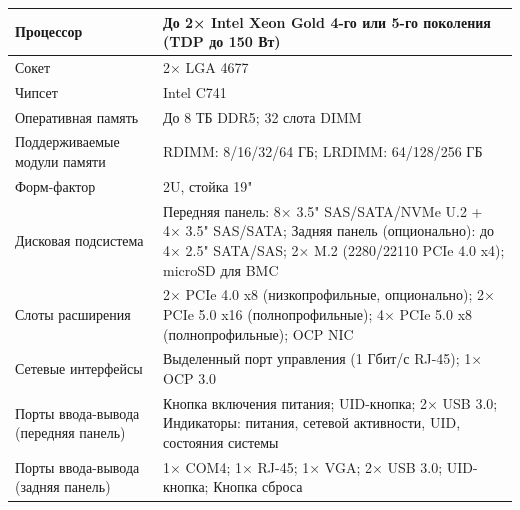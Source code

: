 \documentclass[14pt, a4paper]{extarticle}
\begin{document}
\begin{tabularx}{\textwidth}{|l|X|}
  Процессор                            & До 2× Intel Xeon Gold 4-го или 5-го поколения (TDP до 150 Вт)                                                                                                     \\\hline
  Сокет                                & 2× LGA 4677                                                                                                                                                       \\\hline
  Чипсет                               & Intel C741                                                                                                                                                        \\\hline
  Оперативная память                   & До 8 ТБ DDR5; 32 слота DIMM                                                                                                                                       \\\hline
  Поддерживаемые модули памяти         & RDIMM: 8/16/32/64 ГБ; LRDIMM: 64/128/256 ГБ                                                                                                                       \\\hline
  Форм-фактор                          & 2U, стойка 19"                                                                                                                                                    \\\hline
  Дисковая подсистема                  & Передняя панель: 8× 3.5" SAS/SATA/NVMe U.2 + 4× 3.5" SAS/SATA; Задняя панель (опционально): до 4× 2.5" SATA/SAS; 2× M.2 (2280/22110 PCIe 4.0 x4); microSD для BMC \\\hline
  Слоты расширения                     & 2× PCIe 4.0 x8 (низкопрофильные, опционально); 2× PCIe 5.0 x16 (полнопрофильные); 4× PCIe 5.0 x8 (полнопрофильные); OCP NIC                                       \\\hline
  Сетевые интерфейсы                   & Выделенный порт управления (1 Гбит/с RJ-45); 1× OCP 3.0                                                                                                           \\\hline
  Порты ввода-вывода (передняя панель) & Кнопка включения питания; UID-кнопка; 2× USB 3.0; Индикаторы: питания, сетевой активности, UID, состояния системы                                                 \\\hline
  Порты ввода-вывода (задняя панель)   & 1× COM4; 1× RJ-45; 1× VGA; 2× USB 3.0; UID-кнопка; Кнопка сброса                                                                                                  \\\hline

\end{tabularx}
\end{document}

